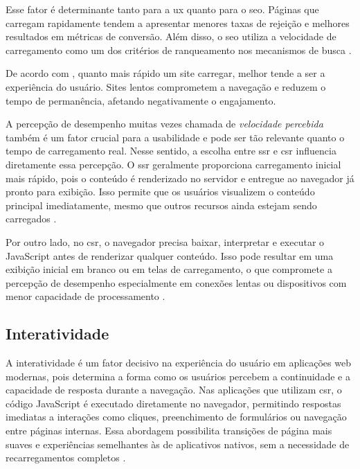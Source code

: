 Esse fator é determinante tanto para a \acrshort{ux} quanto para o \acrshort{seo}. Páginas que carregam rapidamente tendem a apresentar menores taxas de rejeição e melhores resultados em métricas de conversão. Além disso, o \acrshort{seo} utiliza a velocidade de carregamento como um dos critérios de ranqueamento nos mecanismos de busca \cite{conor2022}.

De acordo com , quanto mais rápido um site carregar, melhor tende a ser a experiência do usuário. Sites lentos comprometem a navegação e reduzem o tempo de permanência, afetando negativamente o engajamento.

A percepção de desempenho muitas vezes chamada de \emph{velocidade percebida} também é um fator crucial para a usabilidade e pode ser tão relevante quanto o tempo de carregamento real. Nesse sentido, a escolha entre \acrshort{ssr} e \acrshort{csr} influencia diretamente essa percepção. O \acrshort{ssr} geralmente proporciona carregamento inicial mais rápido, pois o conteúdo é renderizado no servidor e entregue ao navegador já pronto para exibição. Isso permite que os usuários visualizem o conteúdo principal imediatamente, mesmo que outros recursos ainda estejam sendo carregados \cite{atori2024}.

Por outro lado, no \acrshort{csr}, o navegador precisa baixar, interpretar e executar o JavaScript antes de renderizar qualquer conteúdo. Isso pode resultar em uma exibição inicial em branco ou em telas de carregamento, o que compromete a percepção de desempenho especialmente em conexões lentas ou dispositivos com menor capacidade de processamento \cite{pixelfree2023}.


\subsection{Interatividade}
\label{subsec:interatividade}

A interatividade é um fator decisivo na experiência do usuário em aplicações web modernas, pois determina a forma como os usuários percebem a continuidade e a capacidade de resposta durante a navegação. Nas aplicações que utilizam \acrshort{csr}, o código JavaScript é executado diretamente no navegador, permitindo respostas imediatas a interações como cliques, preenchimento de formulários ou navegação entre páginas internas. Essa abordagem possibilita transições de página mais suaves e experiências semelhantes às de aplicativos nativos, sem a necessidade de recarregamentos completos \cite{pixelfree2023}.

